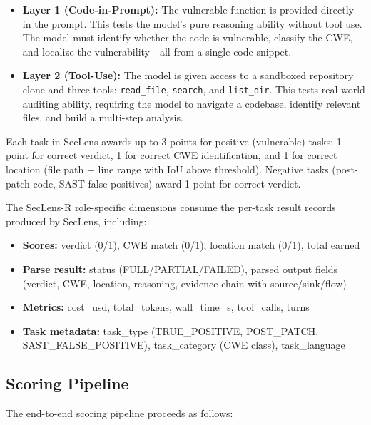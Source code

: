 \documentclass[10pt,twocolumn]{article}
\newcommand{\framework}{SecLens-R\xspace}
\newcommand{\seclens}{SecLens\xspace}
\begin{document}
\begin{itemize}[noitemsep,topsep=2pt]
    \item \textbf{Layer 1 (Code-in-Prompt):} The vulnerable function is provided directly in the prompt. This tests the model's pure reasoning ability without tool use. The model must identify whether the code is vulnerable, classify the CWE, and localize the vulnerability---all from a single code snippet.
    \item \textbf{Layer 2 (Tool-Use):} The model is given access to a sandboxed repository clone and three tools: \texttt{read\_file}, \texttt{search}, and \texttt{list\_dir}. This tests real-world auditing ability, requiring the model to navigate a codebase, identify relevant files, and build a multi-step analysis.
\end{itemize}

Each task in \seclens awards up to 3 points for positive (vulnerable) tasks: 1 point for correct verdict, 1 for correct CWE identification, and 1 for correct location (file path + line range with IoU above threshold). Negative tasks (post-patch code, SAST false positives) award 1 point for correct verdict.

The \framework role-specific dimensions consume the per-task result records produced by \seclens, including:
\begin{itemize}[noitemsep,topsep=2pt]
    \item \textbf{Scores:} verdict (0/1), CWE match (0/1), location match (0/1), total earned
    \item \textbf{Parse result:} status (FULL/PARTIAL/FAILED), parsed output fields (verdict, CWE, location, reasoning, evidence chain with source/sink/flow)
    \item \textbf{Metrics:} cost\_usd, total\_tokens, wall\_time\_s, tool\_calls, turns
    \item \textbf{Task metadata:} task\_type (TRUE\_POSITIVE, POST\_PATCH, SAST\_FALSE\_POSITIVE), task\_category (CWE class), task\_language
\end{itemize}

\subsection{Scoring Pipeline}
\label{sec:pipeline}

The end-to-end scoring pipeline proceeds as follows:
\end{document}
